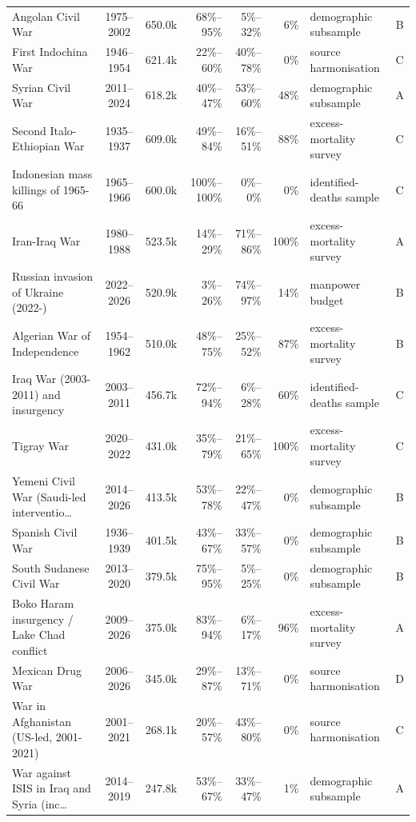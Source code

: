 \documentclass[11pt]{article}
\begin{document}
\begin{scriptsize}
\begin{longtable}{p{4.7cm} c r r r r p{2.8cm} c}
Angolan Civil War & 1975--2002 & 650.0k & 68\%--95\% & 5\%--32\% & 6\% & demographic subsample & B \\
First Indochina War & 1946--1954 & 621.4k & 22\%--60\% & 40\%--78\% & 0\% & source harmonisation & C \\
Syrian Civil War & 2011--2024 & 618.2k & 40\%--47\% & 53\%--60\% & 48\% & demographic subsample & A \\
Second Italo-Ethiopian War & 1935--1937 & 609.0k & 49\%--84\% & 16\%--51\% & 88\% & excess-mortality survey & C \\
Indonesian mass killings of 1965-66 & 1965--1966 & 600.0k & 100\%--100\% & 0\%--0\% & 0\% & identified-deaths sample & C \\
Iran-Iraq War & 1980--1988 & 523.5k & 14\%--29\% & 71\%--86\% & 100\% & excess-mortality survey & A \\
Russian invasion of Ukraine (2022-) & 2022--2026 & 520.9k & 3\%--26\% & 74\%--97\% & 14\% & manpower budget & B \\
Algerian War of Independence & 1954--1962 & 510.0k & 48\%--75\% & 25\%--52\% & 87\% & excess-mortality survey & B \\
Iraq War (2003-2011) and insurgency & 2003--2011 & 456.7k & 72\%--94\% & 6\%--28\% & 60\% & identified-deaths sample & C \\
Tigray War & 2020--2022 & 431.0k & 35\%--79\% & 21\%--65\% & 100\% & excess-mortality survey & C \\
Yemeni Civil War (Saudi-led interventio\ldots{} & 2014--2026 & 413.5k & 53\%--78\% & 22\%--47\% & 0\% & demographic subsample & B \\
Spanish Civil War & 1936--1939 & 401.5k & 43\%--67\% & 33\%--57\% & 0\% & demographic subsample & B \\
South Sudanese Civil War & 2013--2020 & 379.5k & 75\%--95\% & 5\%--25\% & 0\% & demographic subsample & B \\
Boko Haram insurgency / Lake Chad conflict & 2009--2026 & 375.0k & 83\%--94\% & 6\%--17\% & 96\% & excess-mortality survey & A \\
Mexican Drug War & 2006--2026 & 345.0k & 29\%--87\% & 13\%--71\% & 0\% & source harmonisation & D \\
War in Afghanistan (US-led, 2001-2021) & 2001--2021 & 268.1k & 20\%--57\% & 43\%--80\% & 0\% & source harmonisation & C \\
War against ISIS in Iraq and Syria (inc\ldots{} & 2014--2019 & 247.8k & 53\%--67\% & 33\%--47\% & 1\% & demographic subsample & A \\

\end{longtable}
\end{scriptsize}
\end{document}
